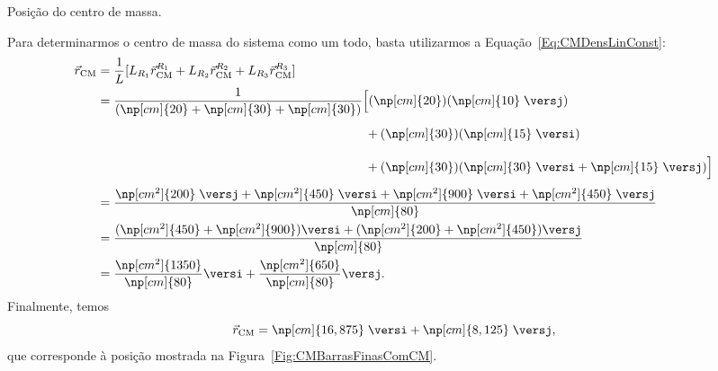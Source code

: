 \begin{marginfigure}
\centering
{}
\caption{Posição do centro de massa. \label{Fig:CMBarrasFinasComCM}}
\end{marginfigure}

Para determinarmos o centro de massa do sistema como um todo, basta utilizarmos a Equação~\ref{Eq:CMDensLinConst}:
\begin{align*}
    \vec{r}_{\rm{CM}} &= \frac{1}{L} [L_{R_1} \vec{r}_{\rm{CM}}^{R_1} + L_{R_2} \vec{r}_{\rm{CM}}^{R_2} + L_{R_3} \vec{r}_{\rm{CM}}^{R_3} ] \\
    &= \frac{1}{(\np[cm]{20} + \np[cm]{30} + \np[cm]{30})} \Big[(\np[cm]{20}) (\np[cm]{10} \;\versj) \\ \nonumber
    &\phantom{= \frac{1}{(\np[cm]{20} + \np[cm]{30} + \np[cm]{30})} \Big[}+ (\np[cm]{30}) (\np[cm]{15} \;\versi) \\ \nonumber
    &\phantom{= \frac{1}{(\np[cm]{20} + \np[cm]{30} + \np[cm]{30})} \Big[}+ (\np[cm]{30}) (\np[cm]{30} \;\versi + \np[cm]{15} \;\versj)\Big]\\
    &= \frac{\np[cm^2]{200}\;\versj + \np[cm^2]{450}\;\versi + \np[cm^2]{900}\;\versi + \np[cm^2]{450}\;\versj}{\np[cm]{80}} \\
    &= \frac{(\np[cm^2]{450} + \np[cm^2]{900})\versi + (\np[cm^2]{200} + \np[cm^2]{450})\versj}{\np[cm]{80}} \\
    &= \frac{\np[cm^2]{1350}}{\np[cm]{80}}\versi + \frac{\np[cm^2]{650}}{\np[cm]{80}}\versj.
\end{align*}
%
Finalmente, temos
\begin{equation}
    \vec{r}_{\rm{CM}} = \np[cm]{16,875}\;\versi + \np[cm]{8,125}\;\versj,
\end{equation}
%
que corresponde à posição mostrada na Figura~\eqref{Fig:CMBarrasFinasComCM}.

